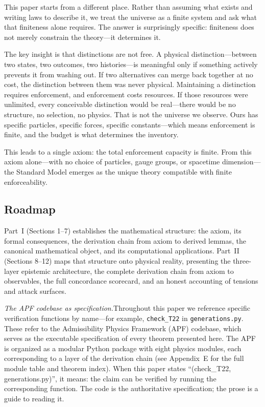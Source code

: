 \documentclass[11pt]{article}
\begin{document}
This paper starts from a different place.  Rather than assuming what exists and writing laws to describe it, we treat the universe as a finite system and ask what that finiteness alone requires.  The answer is surprisingly specific: finiteness does not merely constrain the theory---it determines it.

The key insight is that distinctions are not free.  A physical distinction---between two states, two outcomes, two histories---is meaningful only if something actively prevents it from washing out.  If two alternatives can merge back together at no cost, the distinction between them was never physical.  Maintaining a distinction requires enforcement, and enforcement costs resources.  If those resources were unlimited, every conceivable distinction would be real---there would be no structure, no selection, no physics.  That is not the universe we observe.  Ours has specific particles, specific forces, specific constants---which means enforcement is finite, and the budget is what determines the inventory.

This leads to a single axiom: the total enforcement capacity is finite.  From this axiom alone---with no choice of particles, gauge groups, or spacetime dimension---the Standard Model emerges as the unique theory compatible with finite enforceability.

\subsection{Roadmap}

Part~I (Sections 1--7) establishes the mathematical structure: the axiom, its formal consequences, the derivation chain from axiom to derived lemmas, the canonical mathematical object, and its computational applications.  Part~II (Sections 8--12) maps that structure onto physical reality, presenting the three-layer epistemic architecture, the complete derivation chain from axiom to observables, the full concordance scorecard, and an honest accounting of tensions and attack surfaces.

\medskip
\noindent\textit{The APF codebase as specification.}\quad Throughout this paper we reference specific verification functions by name---for example, \texttt{check\_T22} in \texttt{generations.py}.  These refer to the Admissibility Physics Framework (APF) codebase, which serves as the executable specification of every theorem presented here.  The APF is organized as a modular Python package with eight physics modules, each corresponding to a layer of the derivation chain (see Appendix~E for the full module table and theorem index).  When this paper states ``(check\_T22, generations.py)'', it means: the claim can be verified by running the corresponding function.  The code is the authoritative specification; the prose is a guide to reading it.
\end{document}
